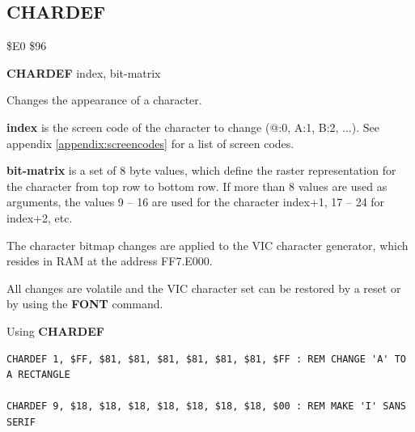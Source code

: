 \subsection{CHARDEF}
\begin{description}[leftmargin=2cm,style=nextline]
\item [Token:]   \$E0 \$96

\item [Format:]  {\bf CHARDEF} index, bit-matrix

\item [Usage:]   Changes the appearance of a character.

                 {\bf index} is the screen code of the character to change (@:0, A:1, B:2, ...). See appendix \vref{appendix:screencodes} for a list of screen codes.

                 {\bf bit-matrix} is a set of 8 byte values, which define the raster representation for the character from top row to bottom row. If more than 8 values are used as arguments, the values 9 -- 16 are used for the character index+1, 17 -- 24 for index+2, etc.

\item [Remarks:] The character bitmap changes are applied to the VIC character generator, which resides in RAM at the address FF7.E000.

                 All changes are volatile and the VIC character set can be restored by a reset or by using the {\bf FONT} command.

\item [Examples:] Using {\bf CHARDEF}

\begin{tcolorbox}[colback=black,coltext=white]
\verbatimfont{\codefont}
\begin{verbatim}
CHARDEF 1, $FF, $81, $81, $81, $81, $81, $81, $FF : REM CHANGE 'A' TO A RECTANGLE

CHARDEF 9, $18, $18, $18, $18, $18, $18, $18, $00 : REM MAKE 'I' SANS SERIF
\end{verbatim}
\end{tcolorbox}
\end{description}


\newpage
